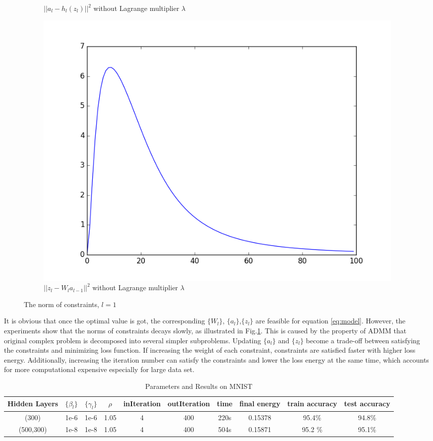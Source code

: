 \documentclass[letterpaper, 10 pt, conference]{ieeeconf}  %
\begin{document}
\begin{figure}
\begin{subfigure}{0.8\columnwidth}
\caption{$||a_l-h_l(z_l)||^2$ without Lagrange multiplier $\lambda$}
\end{subfigure}
\begin{subfigure}{0.8\columnwidth}
\centering
\includegraphics[width=0.7\columnwidth]{figure/zConstraint_no_lambda.png}
\caption{$||z_l-W_la_{l-1}||^2$ without Lagrange multiplier $\lambda$}
\end{subfigure}
\caption{The norm of constraints, $l=1$}
\label{fig:cmpCons}
\end{figure}

It is obvious that once the optimal value is got, the corresponding $\{W_l\}$, $\{a_l\}$,$\{z_l\}$ are feasible for equation \eqref{eq:model}. However, the experiments show that the norms of constraints decays slowly, as illustrated in Fig.\ref{fig:cmpCons}. This is caused by the property of ADMM that original complex problem is decomposed into several simpler subproblems. Updating $\{a_l\}$ and $\{z_l\}$ become a trade-off between satisfying the constraints and minimizing loss function. If increasing the weight of each constraint, constraints are satisfied faster with higher loss energy. Additionally, increasing the iteration number can satisfy the constraints and lower the loss energy at the same time, which accounts for more computational expensive especially for large data set.

\begin{table}[h]
\centering
\caption{Parameters and Results on MNIST}
\begin{tabular}{|c|c|c|c|c|c|c|c|c|c|}
\hline
	Hidden Layers & $\{\beta_l\}$ & $\{\gamma_l\}$ & $\rho$ & inIteration & outIteration & time & final energy & train accuracy & test accuracy\\
\hline
		(300) & 1e-6 & 1e-6 & 1.05 & 4 & 400 & 220s& 0.15378 & 95.4\% & 94.8\% \\
		(500,300) & 1e-8 & 1e-8 & 1.05 & 4 & 400 & 504s & 0.15871 & 95.2 \% & 95.1\% \\ 
\hline
\end{tabular}
\label{tab:parMNIST}
\end{table}
\end{document}
